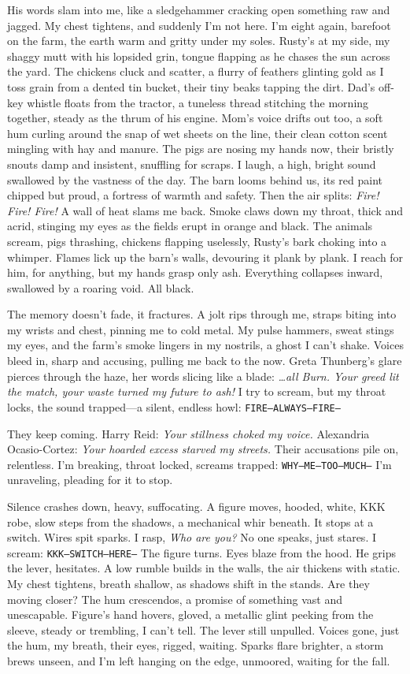 \documentclass[12pt,oneside]{book}
\newcommand{\note}[1]{\texttt{#1}}
\begin{document}
His words slam into me, like a sledgehammer cracking open something raw and jagged. My chest tightens, and suddenly I’m not here. I’m eight again, barefoot on the farm, the earth warm and gritty under my soles. Rusty’s at my side, my shaggy mutt with his lopsided grin, tongue flapping as he chases the sun across the yard. The chickens cluck and scatter, a flurry of feathers glinting gold as I toss grain from a dented tin bucket, their tiny beaks tapping the dirt. Dad’s off-key whistle floats from the tractor, a tuneless thread stitching the morning together, steady as the thrum of his engine. Mom’s voice drifts out too, a soft hum curling around the snap of wet sheets on the line, their clean cotton scent mingling with hay and manure. The pigs are nosing my hands now, their bristly snouts damp and insistent, snuffling for scraps. I laugh, a high, bright sound swallowed by the vastness of the day. The barn looms behind us, its red paint chipped but proud, a fortress of warmth and safety. Then the air splits: \textit{Fire! Fire! Fire!} A wall of heat slams me back. Smoke claws down my throat, thick and acrid, stinging my eyes as the fields erupt in orange and black. The animals scream, pigs thrashing, chickens flapping uselessly, Rusty’s bark choking into a whimper. Flames lick up the barn’s walls, devouring it plank by plank. I reach for him, for anything, but my hands grasp only ash. Everything collapses inward, swallowed by a roaring void. All black.

The memory doesn’t fade, it fractures. A jolt rips through me, straps biting into my wrists and chest, pinning me to cold metal. My pulse hammers, sweat stings my eyes, and the farm’s smoke lingers in my nostrils, a ghost I can’t shake. Voices bleed in, sharp and accusing, pulling me back to the now. Greta Thunberg’s glare pierces through the haze, her words slicing like a blade: \textit{…all Burn. Your greed lit the match, your waste turned my future to ash!} I try to scream, but my throat locks, the sound trapped—a silent, endless howl: \note{FIRE—ALWAYS—FIRE—}

They keep coming. Harry Reid: \textit{Your stillness choked my voice.} Alexandria Ocasio-Cortez: \textit{Your hoarded excess starved my streets.} Their accusations pile on, relentless. I’m breaking, throat locked, screams trapped: \note{WHY—ME—TOO—MUCH—} I’m unraveling, pleading for it to stop.

Silence crashes down, heavy, suffocating. A figure moves, hooded, white, KKK robe, slow steps from the shadows, a mechanical whir beneath. It stops at a switch. Wires spit sparks. I rasp, \textit{Who are you?} No one speaks, just stares. I scream: \note{KKK—SWITCH—HERE—} The figure turns. Eyes blaze from the hood. He grips the lever, hesitates. A low rumble builds in the walls, the air thickens with static. My chest tightens, breath shallow, as shadows shift in the stands. Are they moving closer? The hum crescendos, a promise of something vast and unescapable. Figure’s hand hovers, gloved, a metallic glint peeking from the sleeve, steady or trembling, I can’t tell. The lever still unpulled. Voices gone, just the hum, my breath, their eyes, rigged, waiting. Sparks flare brighter, a storm brews unseen, and I’m left hanging on the edge, unmoored, waiting for the fall.
\end{document}

